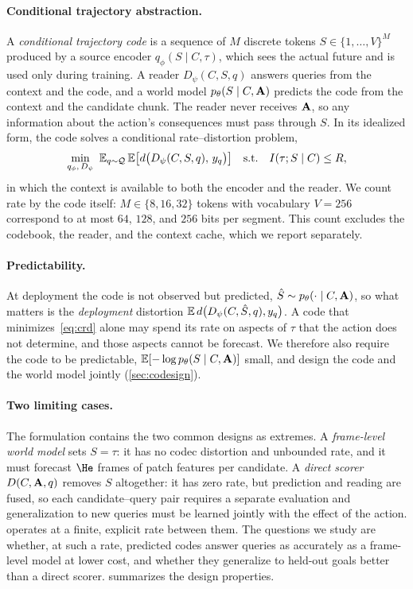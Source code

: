 \paragraph{Conditional trajectory abstraction.}
A \emph{conditional trajectory code} is a sequence of $M$ discrete tokens $S\in\{1,\dots,V\}^M$ produced by a source encoder $q_\phi(S\mid C,\tau)$, which sees the actual future and is used only during training.
A reader $D_\psi(C,S,q)$ answers queries from the context and the code, and a world model $p_\theta(S\mid C,\mathbf{A})$ predicts the code from the context and the candidate chunk.
The reader never receives $\mathbf{A}$, so any information about the action's consequences must pass through $S$.
In its idealized form, the code solves a conditional rate--distortion problem,
\begin{equation}
  \min_{q_\phi,\,D_\psi}\ \E_{q\sim\mathcal{Q}}\,\E\big[d\big(D_\psi(C,S,q),\,y_q\big)\big]\quad\text{s.t.}\quad I(\tau;S\mid C)\le R,
  \label{eq:crd}
\end{equation}
in which the context is available to both the encoder and the reader.
We count rate by the code itself: $M\in\{8,16,32\}$ tokens with vocabulary $V{=}256$ correspond to at most $64$, $128$, and $256$ bits per segment.
This count excludes the codebook, the reader, and the context cache, which we report separately.

\paragraph{Predictability.}
At deployment the code is not observed but predicted, $\hat S\sim p_\theta(\cdot\mid C,\mathbf{A})$, so what matters is the \emph{deployment} distortion $\mathbb{E}\,d\big(D_\psi(C,\hat S,q),y_q\big)$.
A code that minimizes~\eqref{eq:crd} alone may spend its rate on aspects of $\tau$ that the action does not determine, and those aspects cannot be forecast.
We therefore also require the code to be predictable, $\mathbb{E}[-\log p_\theta(S\mid C,\mathbf{A})]$ small, and design the code and the world model jointly (\cref{sec:codesign}).

\paragraph{Two limiting cases.}
The formulation contains the two common designs as extremes.
A \emph{frame-level world model} sets $S=\tau$: it has no codec distortion and unbounded rate, and it must forecast $\He$ frames of patch features per candidate.
A \emph{direct scorer} $D(C,\mathbf{A},q)$ removes $S$ altogether: it has zero rate, but prediction and reading are fused, so each candidate--query pair requires a separate evaluation and generalization to new queries must be learned jointly with the effect of the action.
\method operates at a finite, explicit rate between them.
The questions we study are whether, at such a rate, predicted codes answer queries as accurately as a frame-level model at lower cost, and whether they generalize to held-out goals better than a direct scorer.
 summarizes the design properties.

